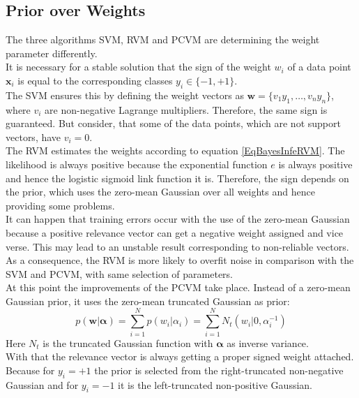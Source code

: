 \subsection{Prior over Weights}\label{PcSecWeights}
The three algorithms \acs{SVM}, \acs{RVM} and \acs{PCVM} are determining the weight parameter differently.\\
It is necessary for a stable solution that the sign of the weight $w_i$ of a data point $\mathbf{x}_i$ is equal to the corresponding classes $y_i \in\{-1,+1\}$.\cite{Chen.2009}\\
The \ac{SVM} ensures this by defining the weight vectors as $\mathbf{w} = \{v_1y_1,\dots,v_ny_n\}$, where $v_i$ are non-negative Lagrange multipliers.
Therefore, the same sign is guaranteed.\cite{Chen.2009}
But consider, that some of the data points, which are not support vectors, have $v_i=0$.\cite[p. 330]{Bishop.2009} \\
The \ac{RVM} estimates the weights according to equation \eqref{EqBayesInfeRVM}.
The likelihood is always positive because the exponential function $e$ is always positive \cite[p. 355]{Hartmann.2015} and hence the logistic sigmoid link function it is.
Therefore, the sign depends on the prior, which uses the zero-mean Gaussian over all weights and hence providing some problems.\\
It can happen that training errors occur with the use of the zero-mean Gaussian because a positive relevance vector can get a negative weight assigned and vice verse.
This may lead to an unstable result corresponding to non-reliable vectors.
As a consequence, the \acs{RVM} is more likely to overfit noise in comparison with the \acs{SVM} and \acs{PCVM}, with same selection of parameters.\cite{Chen.2009}\\
At this point the improvements of the \acs{PCVM} take place. 
Instead of a zero-mean Gaussian prior, it uses the zero-mean truncated Gaussian as prior:\cite{Chen.2009}
\begin{equation}\label{EqPcvmNtPrior}
p(\mathbf{w} \vert \boldsymbol{\alpha}) = \sum_{i=1}^{N}p(w_i \vert \alpha_i) = \sum_{i=1}^{N}N_t(w_i \vert 0,\alpha_i^{-1})
\end{equation}
Here $N_t$ is the truncated Gaussian function with $\boldsymbol{\alpha}$ as inverse variance.\\
With that the relevance vector is always getting a proper signed weight attached.
Because for $y_i=+1$ the prior is selected from the right-truncated non-negative Gaussian and for $y_i=-1$ it is the left-truncated non-positive Gaussian.\cite{Chen.2009}\\
